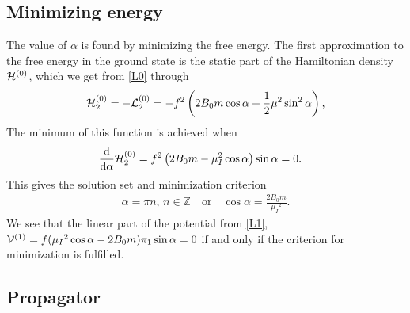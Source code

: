 \subsection*{Minimizing energy}
The value of $\alpha$ is found by minimizing the free energy. 
The first approximation to the free energy in the ground state is the static part of the Hamiltonian density $\mathcal{H}^{(0)}$, which we get from \autoref{L0} through
\begin{equation}
    \mathcal{H}_2^{(0)} = - \mathcal{L}_2^{(0)} = 
    -f^2   
    \left(
        2B_0m \cos{\alpha}
        + \frac{1}{2} \mu^2 \sin^2{\alpha}
    \right),
\end{equation}
The minimum of this function is achieved when
\begin{align*}
    &\dv{\alpha} \mathcal{H}_2^{(0)} 
    = f^2\left(2B_0m - \mu_I^2\cos{\alpha}\right)\sin{\alpha}
    = 0.
\end{align*}
This gives the solution set and minimization criterion
\begin{align}
    \alpha = \pi n, \, n \in \mathbb{Z} \quad
    \mathrm{or} \quad
    \cos{\alpha} = \frac{2B_0m}{\mu_I{}^2}.
\end{align}
We see that the linear part of the potential from \autoref{L1}, $\mathcal{V}^{(1)} = f(\mu_I{}^2\cos{\alpha} - 2B_0m)\pi_1 \sin{\alpha}= 0$ if and only if the criterion for minimization is fulfilled.

\subsection*{Propagator}

